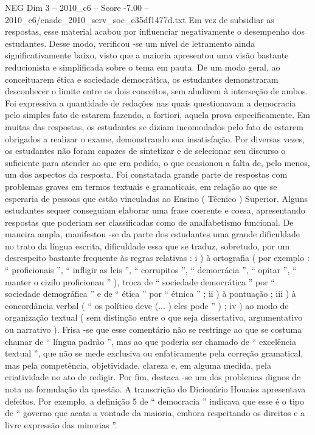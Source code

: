 \begin{textsample}{NEG Dim 3 – 2010\_c6 – Score -7.00 – 2010\_c6/enade\_2010\_serv\_soc\_e35df1477d.txt}
Em vez de subsidiar as respostas, esse material acabou por influenciar negativamente o desempenho dos estudantes.
Desse modo, verificou -se um nível de letramento ainda significativamente baixo, visto que a maioria apresentou uma visão bastante reducionista e simplificada sobre o tema em pauta.
De um modo geral, ao conceituarem ética e sociedade democrática, os estudantes demonstraram desconhecer o limite entre os dois conceitos, sem aludirem à interseção de ambos.
Foi expressiva a quantidade de redações nas quais questionavam a democracia pelo simples fato de estarem fazendo, a fortiori, aquela prova especificamente.
Em muitas das respostas, os estudantes se diziam incomodados pelo fato de estarem obrigados a realizar o exame, demonstrando sua insatisfação.
Por diversas vezes, os estudantes não foram capazes de sintetizar e de selecionar seu discurso o suficiente para atender ao que era pedido, o que ocasionou a falta de, pelo menos, um dos aspectos da resposta.
Foi constatada grande parte de respostas com problemas graves em termos textuais e gramaticais, em relação ao que se esperaria de pessoas que estão vinculadas ao Ensino ( Técnico ) Superior.
Alguns estudantes sequer conseguiam elaborar uma frase coerente e coesa, apresentando respostas que poderiam ser classificadas como de analfabetismo funcional.
De maneira ampla, manifestou -se da parte dos estudantes uma grande dificuldade no trato da língua escrita, dificuldade essa que se traduz, sobretudo, por um desrespeito bastante frequente às regras relativas : i ) à ortografia ( por exemplo : “ proficionais ”, “ infligir as leis ”, “ corrupitos ”, “ democrácia ”, “ opitar ”, “ manter o cizilo proficionau ” ), troca de “ sociedade democrática ” por “ sociedade demográfica ” e de “ ética ” por “ étnica ” ; ii ) à pontuação ; iii ) à concordância verbal ( “ os político deve (... ) eles pode ” ) ; iv ) ao modo de organização textual ( sem distinção entre o que seja dissertativo, argumentativo ou narrativo ).
Frisa -se que esse comentário não se restringe ao que se costuma chamar de “ língua padrão ”, mas ao que poderia ser chamado de “ excelência textual ”, que não se mede exclusiva ou enfaticamente pela correção gramatical, mas pela competência, objetividade, clareza e, em alguma medida, pela criatividade no ato de redigir.
Por fim, destaca -se um dos problemas dignos de nota na formulação da questão.
A transcrição do Dicionário Houaiss apresentava defeitos.
Por exemplo, a definição 5 de “ democracia ” indicava que esse é o tipo de “ governo que acata a vontade da maioria, embora respeitando os direitos e a livre expressão das minorias ”.

\end{textsample}
